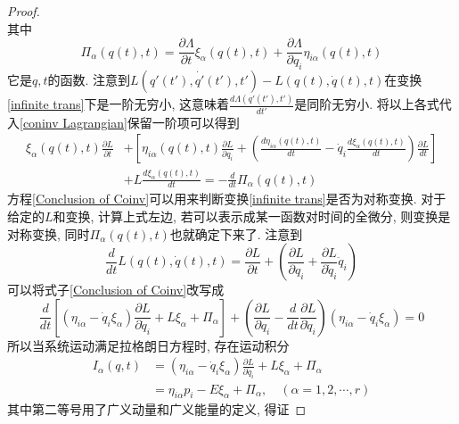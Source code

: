 \documentclass[a4paper,11pt]{article}
\newtheorem{proof}{证明}[section]
\begin{document}
\begin{proof}
\begin{equation*}
  \end{equation*}
  其中
  \begin{equation}\label{Pi_alpha}
    \Pi_\alpha(q(t),t)=\frac{\partial \Lambda}{\partial t}\xi_\alpha(q(t),t)+\frac{\partial \Lambda}{\partial{q_i}}\eta_{i\alpha}(q(t),t)
  \end{equation}
  它是$q,t$的函数. 注意到$L(q'(t'),\dot{q'}(t'),t')-L(q(t),\dot{q}(t),t)$在变换\eqref{infinite trans}下是一阶无穷小, 这意味着$\frac{d\Lambda(q'(t'),t')}{dt'}$是同阶无穷小. 将以上各式代入\eqref{coninv Lagrangian}保留一阶项可以得到
  \begin{equation}\label{Conclusion of Coinv}
  \begin{split}
     \xi_\alpha(q(t),t)\frac{\partial L}{\partial t}&+\left[\eta_{i\alpha}(q(t),t)\frac{\partial L}{\partial{q}_i}+\left(\frac{d\eta_{i\alpha}(q(t),t)}{dt}-\dot{q}_i\frac{d\xi_\alpha(q(t),t)}{dt}\right)\frac{\partial L}{dt}\right] \\
     &+L\frac{d\xi_\alpha(q(t),t)}{dt}=-\frac{d}{dt}\Pi_\alpha(q(t),t)
  \end{split}
  \end{equation}
  方程\eqref{Conclusion of Coinv}可以用来判断变换\eqref{infinite trans}是否为对称变换. 对于给定的$L$和变换, 计算上式左边, 若可以表示成某一函数对时间的全微分, 则变换是对称变换, 同时$\Pi_\alpha(q(t),t)$也就确定下来了. 注意到
  \begin{equation*}
    \frac{d}{dt}L(q(t),\dot{q}(t),t)=\frac{\partial L}{\partial t}+\left(\frac{\partial L}{\partial{q_i}}+\frac{\partial L}{\partial{\dot{q}_i}}\ddot{q}_i\right)
  \end{equation*}
  可以将式子\eqref{Conclusion of Coinv}改写成
  \begin{equation*}
    \frac{d}{dt}\left[(\eta_{i\alpha}-\dot{q}_i\xi_\alpha)\frac{\partial L}{\partial\dot{q}_i}+L\xi_\alpha+\Pi_\alpha\right]+\left(\frac{\partial L}{\partial{q}_i}-\frac{d}{dt}\frac{\partial L}{\partial\dot{q}_i}\right)(\eta_{i\alpha}-\dot{q}_i\xi_\alpha)=0
  \end{equation*}
  所以当系统运动满足拉格朗日方程时, 存在运动积分
  \begin{equation}\label{Movement Integrate}
  \begin{split}
     I_\alpha(q,t)&=(\eta_{i\alpha}-\dot{q}_i\xi_\alpha)\frac{\partial L}{\partial\dot{q}_i}+L\xi_\alpha+\Pi_\alpha \\
       &=\eta_{i\alpha}p_i-E\xi_\alpha+\Pi_\alpha,\quad (\alpha=1,2,\cdots,r)
  \end{split}
  \end{equation}
  其中第二等号用了广义动量和广义能量的定义, 得证
\end{proof}
\end{document}
